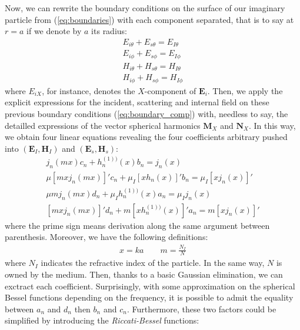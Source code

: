\documentclass{article}
\begin{document}
Now, we can rewrite the boundary conditions on the surface of our imaginary particle from (\ref{eq:boundaries}) with each component separated, that is to say at $r=a$ if we denote by $a$ its radius:
\begin{equation}\label{eq:boundary_comp}
\begin{aligned}
E_{i\theta} + E_{s\theta} = E_{I\theta}\\
E_{i\phi} + E_{s\phi} = E_{I\phi}\\
H_{i\theta} + H_{s\theta} = H_{I\theta}\\
H_{i\phi} + H_{s\phi} = H_{I\phi}
\end{aligned}
\end{equation}
where $E_{iX}$, for instance, denotes the $X$-component of $\textbf{E}_{i}$. Then, we apply the explicit expressions for the incident, scattering and internal field on these previous boundary conditions (\ref{eq:boundary_comp}) with, needless to say, the detailled expressions of the vector spherical harmonics $\textbf{M}_{X}$ and $\textbf{N}_{X}$. In this way, we obtain four linear equations revealing the four coefficients arbitrary pushed into $(\textbf{E}_{I}, \textbf{H}_{I})$ and $(\textbf{E}_{s}, \textbf{H}_{s})$:
\begin{equation}
\begin{aligned}
j_{n}(mx)c_{n} + h^{(1))}_{n}(x)b_{n} = j_{n}(x) \\
\mu[mxj_{n}(mx)]'c_{n} + \mu_{I}[xh_{n}(x)]'b_{n} = \mu_{I}[xj_{n}(x)]' \\
\mu mj_{n}(mx)d_{n} + \mu_{I}h^{(1))}_{n}(x)a_{n} = \mu_{I}j_{n}(x) \\
[mxj_{n}(mx)]'d_{n}+m[xh^{(1))}_{n}(x)]'a_{n} = m[xj_{n}(x)]'
\end{aligned}
\end{equation}
where the prime sign means derivation along the same argument between parenthesis. Moreover, we have the following definitions:
\begin{equation}
\begin{aligned}
x = ka \qquad m = \frac{N_{I}}{N}
\end{aligned}
\end{equation}
where $N_{I}$ indicates the refractive index of the particle. In the same way, $N$ is owned by the medium. Then, thanks to a basic Gaussian elimination, we can exctract each coefficient. Surprisingly, with some approximation on the spherical Bessel functions depending on the frequency, it is possible to admit the equality between $a_{n}$ and $d_{n}$ then $b_{n}$ and $c_{n}$. Furthermore, these two factors could be simplified by introducing the \textit{Riccati-Bessel} functions:
\end{document}
